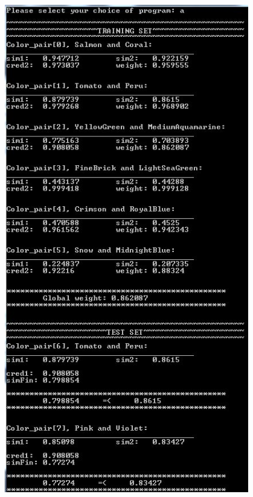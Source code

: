 \documentclass[egilmezThesis.tex]{subfiles}
\begin{document}
\newpage
\begin{center}
\label{The console output}
\includegraphics[width=0.8\textwidth]{console.jpg}
\end{center}
\end{document}
